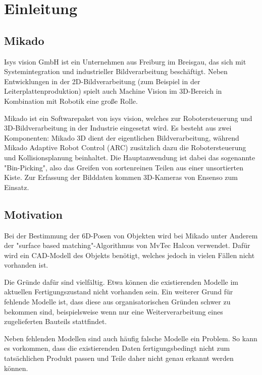 
\chapter{Einleitung}

\section{Mikado}

Isys vision GmbH \cite{isysWebsite} ist ein Unternehmen aus Freiburg im Breisgau, das sich mit Systemintegration und industrieller Bildverarbeitung beschäftigt.
Neben Entwicklungen in der 2D-Bildverarbeitung (zum Beispiel in der Leiterplattenproduktion) spielt auch Machine Vision im 3D-Bereich in Kombination mit Robotik eine große Rolle.


Mikado \cite{mikadoWebsite} ist ein Softwarepaket von isys vision, welches zur Robotersteuerung und 3D-Bildverarbeitung in der Industrie eingesetzt wird.
Es besteht aus zwei Komponenten: Mikado 3D dient der eigentlichen Bildverarbeitung, während Mikado Adaptive Robot Control (ARC) zusätzlich dazu die Robotersteuerung und Kollisionsplanung beinhaltet.
Die Hauptanwendung ist dabei das sogenannte "Bin-Picking", also das Greifen von sortenreinen Teilen aus einer unsortierten Kiste.
Zur Erfassung der Bilddaten kommen 3D-Kameras von Ensenso \cite{ensensoWebsite} zum Einsatz.


\section{Motivation}

Bei der Bestimmung der 6D-Posen von Objekten wird bei Mikado unter Anderem der "surface based matching"-Algorithmus von MvTec Halcon \cite{drost2014recognition} verwendet.
Dafür wird ein CAD-Modell des Objekts benötigt, welches jedoch in vielen Fällen nicht vorhanden ist.

Die Gründe dafür sind vielfältig.
Etwa können die existierenden Modelle im aktuellen Fertigungszustand nicht vorhanden sein.
Ein weiterer Grund für fehlende Modelle ist, dass diese aus organisatorischen Gründen schwer zu bekommen sind, beispielsweise wenn nur eine Weiterverarbeitung eines zugelieferten Bauteils stattfindet.

Neben fehlenden Modellen sind auch häufig falsche Modelle ein Problem.
So kann es vorkommen, dass die existierenden Daten fertigungsbedingt nicht zum tatsächlichen Produkt passen und Teile daher nicht genau erkannt werden können.


